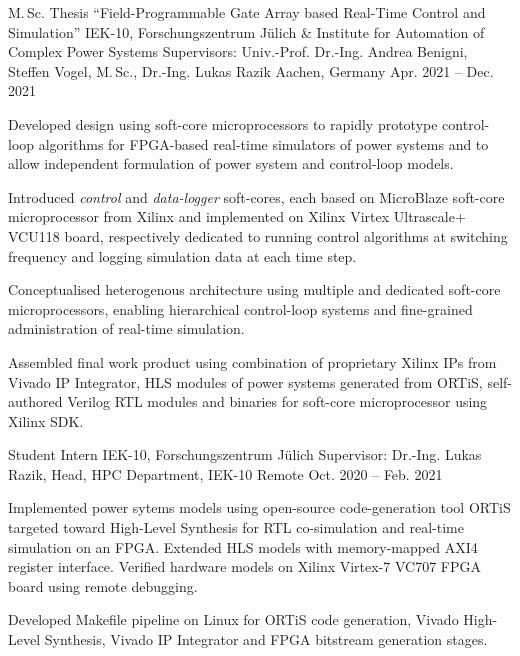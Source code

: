 \begin{cvexperience}

\cvposition
	{M.\,Sc. Thesis ``Field-Programmable Gate Array based Real-Time Control and Simulation''} %
	{IEK-10, Forschungszentrum J\"ulich \& Institute for Automation of Complex Power Systems} %
	{Supervisors: Univ.-Prof. Dr.-Ing. Andrea Benigni, Steffen Vogel, M.\,Sc., Dr.-Ing. Lukas Razik} %
	{Aachen, Germany  {\acvHeaderIconSep{}} {} } %
	{Apr. 2021 -- Dec. 2021  {\acvHeaderIconSep{}} {} } %
	{\begin{cvitems}
		\item {Developed design using soft-core microprocessors to rapidly prototype control-loop algorithms for FPGA-based real-time simulators of power systems and to allow independent formulation of power system and control-loop models.}
		\item {Introduced \textit{control} and \textit{data-logger} soft-cores, each based on MicroBlaze soft-core microprocessor from Xilinx and implemented on Xilinx Virtex Ultrascale+ VCU118 board, respectively dedicated to running control algorithms at switching frequency and logging simulation data at each time step.} 
		\item {Conceptualised heterogenous architecture using multiple and dedicated soft-core microprocessors, enabling hierarchical control-loop systems and fine-grained administration of real-time simulation.}
  		\item {Assembled final work product using combination of proprietary Xilinx IPs from Vivado IP Integrator, HLS modules of power systems generated from ORTiS, self-authored Verilog RTL modules and binaries for soft-core microprocessor using Xilinx SDK.}
	\end{cvitems}}

\cvposition
	{Student Intern} %
	{IEK-10, Forschungszentrum J\"ulich} %
	{Supervisor: Dr.-Ing. Lukas Razik, Head, HPC Department, IEK-10} %
	{Remote  {\acvHeaderIconSep{}} {} } %
	{Oct. 2020 -- Feb. 2021  {\acvHeaderIconSep{}} {} } %
	{\begin{cvitems}
		\item {Implemented power sytems models using open-source code-generation tool ORTiS targeted toward High-Level Synthesis for RTL co-simulation and real-time simulation on an FPGA. Extended HLS models with memory-mapped AXI4 register interface. Verified hardware models on Xilinx Virtex-7 VC707 FPGA board using remote debugging.}
  		\item {Developed Makefile pipeline on Linux for ORTiS code generation, Vivado High-Level Synthesis, Vivado IP Integrator and FPGA bitstream generation stages.}
	\end{cvitems}}


\end{cvexperience}
